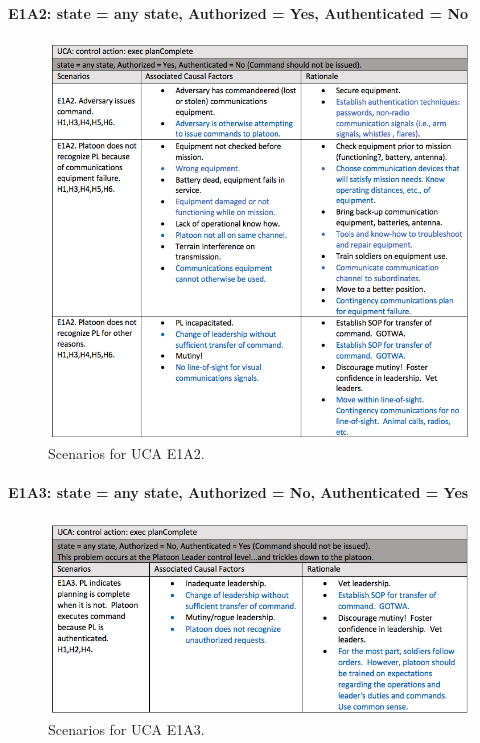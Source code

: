 \documentclass[../../main/main.tex]{subfiles}
\begin{document}
\paragraph*{E1A2: state  = any state, Authorized = Yes, Authenticated = No}
\begin{figure}[ht!]
\begin{center}
\includegraphics[width=\linewidth]{../figures/ucae1a2}
\caption{Scenarios for UCA E1A2.}
\label{ucae1a2}
\end{center}
\end{figure}
\clearpage

\paragraph*{E1A3: state  = any state, Authorized = No, Authenticated = Yes}

\begin{figure}[ht!]
\begin{center}
\includegraphics[width=\linewidth]{../figures/ucae1a3}
\caption{Scenarios for UCA E1A3.}
\label{ucae1a3}
\end{center}
\end{figure}
\clearpage
\end{document}
